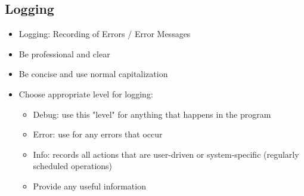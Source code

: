 \subsection{Logging}
\begin{itemize}
	\item Logging: Recording of Errors / Error Messages
	\item Be professional and clear
	\item Be concise and use normal capitalization
	\item Choose appropriate level for logging:
	\begin{itemize}
		\item Debug: use this "level" for anything that happens in the program
		\item Error: use for any errors that occur
		\item Info: records all actions that are user-driven or system-specific (regularly scheduled operations)
		\item Provide any useful information
	\end{itemize}
\end{itemize}

